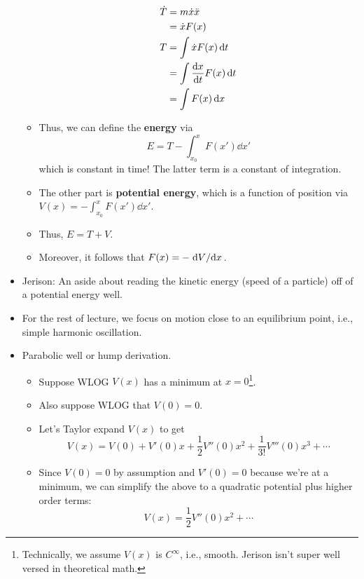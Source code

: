 \documentclass[../notes.tex]{subfiles}
\begin{document}
\begin{itemize}
\begin{itemize}
        \begin{align*}
            \dot{T} &= m\dot{x}\ddot{x}\\
            &= \dot{x}F(x)\\
            T &= \int\dot{x}F(x)\dd{t}\\
            &= \int\dv{x}{t}F(x)\dd{t}\\
            &= \int F(x)\dd{x}
        \end{align*}
        \item Thus, we can define the \textbf{energy} via
        \begin{equation*}
            E = T-\int_{x_0}^xF(x')\dd{x'}
        \end{equation*}
        which is constant in time! The latter term is a constant of integration.
        \item The other part is \textbf{potential energy}, which is a function of position via $V(x)=-\int_{x_0}^xF(x')\dd{x'}$.
        \item Thus, $E=T+V$.
        \item Moreover, it follows that $F(x)=-\dv*{V}{x}$.
    \end{itemize}
    \item Jerison: An aside about reading the kinetic energy (speed of a particle) off of a potential energy well.
    \item For the rest of lecture, we focus on motion close to an equilibrium point, i.e., simple harmonic oscillation.
    \item Parabolic well or hump derivation.
    \begin{itemize}
        \item Suppose WLOG $V(x)$ has a minimum at $x=0$\footnote{Technically, we assume $V(x)$ is $C^\infty$, i.e., smooth. Jerison isn't super well versed in theoretical math.}.
        \item Also suppose WLOG that $V(0)=0$.
        \item Let's Taylor expand $V(x)$ to get
        \begin{equation*}
            V(x) = V(0)+V'(0)x+\frac{1}{2}V''(0)x^2+\frac{1}{3!}V'''(0)x^3+\cdots
        \end{equation*}
        \item Since $V(0)=0$ by assumption and $V'(0)=0$ because we're at a minimum, we can simplify the above to a quadratic potential plus higher order terms:
        \begin{equation*}
            V(x) = \frac{1}{2}V''(0)x^2+\cdots
        \end{equation*}

\end{itemize}
\end{itemize}
\end{document}
